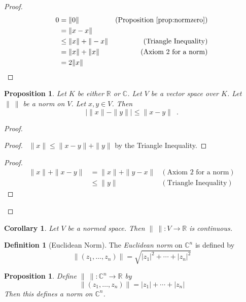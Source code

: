 \documentclass{book}
\let\qed\relax
\newtheorem{prop}[ax]{Proposition}
\newtheorem{cor}{Corollary}[ax]
\theoremstyle{definition}
\newtheorem{df}[ax]{Definition}
\begin{document}
\begin{proof}
\pf
\begin{align*}
0 & = \| 0 \| &  (\text{Proposition \ref{prop:normzero}}) \\
& = \| x - x \| \\
& \leq \| x \| + \| - x \| & (\text{Triangle Inequality}) \\
& = \| x \| + \| x \| & (\text{Axiom 2 for a norm}) \\
& = 2 \| x\| & \qed
\end{align*}
\end{proof}

\begin{prop}
\label{prop:distancebetweennorms}
Let $K$ be either $\mathbb{R}$ or $\mathbb{C}$. Let $V$ be a vector space over $K$. Let $\|\ \|$ be a norm on $V$. Let $x,y \in V$. Then
\[ | \| x \| - \| y \| | \leq \| x - y \| \enspace . \]
\end{prop}

\begin{proof}
\pf
{}
\begin{proof}
	\pf\ $\|x\| \leq \| x - y \| + \|y \|$ by the Triangle Inequality.
\end{proof}
\begin{proof}
	\pf
	\begin{align*}
		\| x \| + \| x - y \| & = \| x \| + \| y - x\| & (\text{Axiom 2 for a norm}) \\
		& \leq \| y \| & (\text{Triangle Inequality})
	\end{align*}
\end{proof}
\qed
\end{proof}

\begin{cor}
Let $V$ be a normed space. Then $\|\ \| : V \rightarrow \mathbb{R}$ is continuous.
\end{cor}

\begin{df}[Euclidean Norm]
The \emph{Euclidean norm} on $\mathbb{C}^n$ is defined by
\[ \| (z_1, \ldots, z_n) \| = \sqrt{|z_1|^2 + \cdots + |z_n|^2} \]
\end{df}

\begin{prop}
Define $\|\ \| : \mathbb{C}^n \rightarrow \mathbb{R}$ by
\[ \| (z_1, \ldots, z_n) \| = |z_1| + \cdots + |z_n| \]
Then this defines a norm on $\mathbb{C}^n$.
\end{prop}
\end{document}
